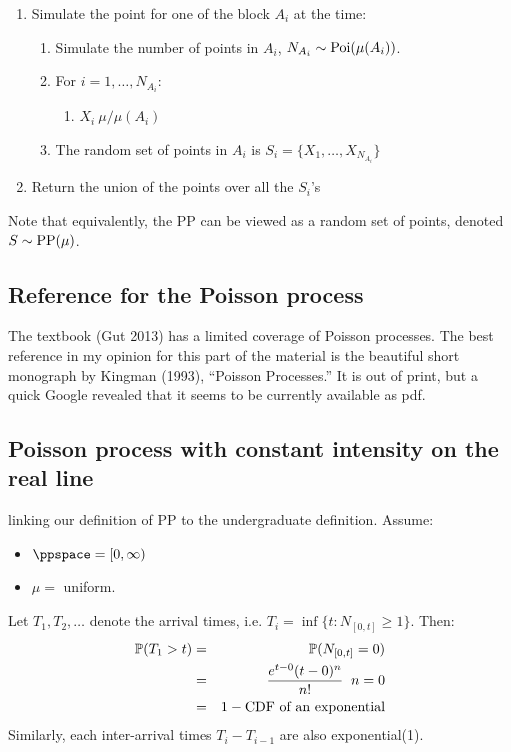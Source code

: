 \documentclass{article}
\begin{document}
\begin{enumerate}
  \item Simulate the point for one of the block $A_i$ at the time:
  \begin{enumerate}
    \item Simulate the number of points in $A_i$, $N_{A_i} \sim \Poi(\mu(A_i))$.
    \item For $i = 1, \dots, N_{A_i}$:
    \begin{enumerate}
      \item $X_i ~ \mu / \mu(A_i)$
    \end{enumerate}
    \item The random set of points in $A_i$ is $S_i = \{X_1, \dots, X_{N_{A_i}}\}$
  \end{enumerate}
  \item Return the union of the points over all the $S_i$'s
\end{enumerate}

Note that equivalently, the PP can be viewed as a random set of points, denoted $S \sim \PP(\mu)$.


\subsection{Reference for the Poisson process}

The textbook (Gut 2013) has a limited coverage of Poisson processes. The best reference in my opinion for this part of the material is the beautiful short monograph by Kingman (1993), ``Poisson Processes.'' It is out of print, but a quick Google revealed that it seems to be currently available as pdf. 


\subsection{Poisson process with constant intensity on the real line}

 linking our definition of PP to the undergraduate definition. Assume:
\begin{itemize}
  \item $\ppspace = [0, \infty)$
  \item $\mu =$ uniform.
\end{itemize}
Let $T_1, T_2, \dots$ denote the arrival times, i.e. $T_i = \inf\{t : N_{[0,t]} \ge 1\}$.
Then:
\begin{eqnarray}
\P(T_1 > t) &=& \P(N_{[0,t]} = 0) \\
&=& \frac{e^{t - 0} (t-0)^n}{n!} \;\;n=0 \\
&=& 1 - \text{CDF of an exponential}
\end{eqnarray}
Similarly, each inter-arrival times $T_i - T_{i-1}$ are also exponential(1).
\end{document}
